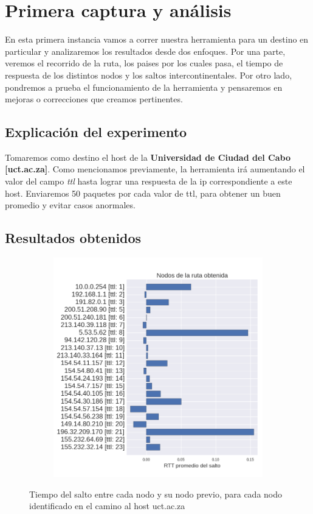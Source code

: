 \section{Primera captura y análisis}
\par En esta primera instancia vamos a correr nuestra herramienta para un destino en particular y analizaremos los resultados desde dos enfoques. Por una parte, veremos el recorrido de la ruta, los paises por los cuales pasa, el tiempo de respuesta de los distintos nodos y los saltos intercontinentales. Por otro lado, pondremos a prueba el funcionamiento de la herramienta y pensaremos en mejoras o correcciones que creamos pertinentes.

\subsection{Explicación del experimento}
\par Tomaremos como destino el host de la \textbf{Universidad de Ciudad del Cabo [uct.ac.za]}. Como mencionamos previamente, la herramienta irá aumentando el valor del campo \textit{ttl} hasta lograr una respuesta de la ip correspondiente a este host. Enviaremos 50 paquetes por cada valor de ttl, para obtener un buen promedio y evitar casos anormales.

\subsection{Resultados obtenidos}

\begin{figure}[h]
  \begin{subfigure}[b]{.5\textwidth}
    \includegraphics[width=\textwidth]{Imagenes/capetown_rtts.png}
  \end{subfigure}
  \label{fig:capetown_rtts}
  \caption{Tiempo del salto entre cada nodo y su nodo previo, para cada nodo identificado en el camino al host uct.ac.za}
\end{figure}

